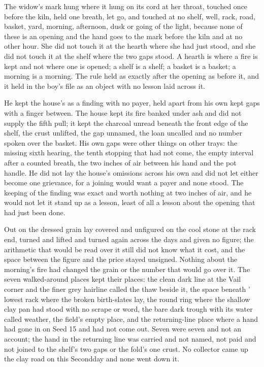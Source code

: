 The widow's mark hung where it hung on its cord at her throat, touched once before the kiln, held one breath, let go, and touched at no shelf, well, rack, road, basket, yard, morning, afternoon, dusk or going of the light, because none of these is an opening and the hand goes to the mark before the kiln and at no other hour. She did not touch it at the hearth where she had just stood, and she did not touch it at the shelf where the two gaps stood. A hearth is where a fire is kept and not where one is opened; a shelf is a shelf; a basket is a basket; a morning is a morning. The rule held as exactly after the opening as before it, and it held in the boy's file as an object with no lesson laid across it.

He kept the house's  as a finding with no payer, held apart from his own kept gaps with a finger between. The house kept its fire banked under ash and did not supply the fifth pull; it kept the charcoal unread beneath the front edge of the shelf, the crust unlifted, the gap unnamed, the loan uncalled and no number spoken over the basket. His own gaps were other things on other trays: the missing sixth hearing, the tenth stopping that had not come, the empty interval after a counted breath, the two inches of air between his hand and the pot handle. He did not lay the house's omissions across his own and did not let either become one grievance, for a joining would want a payer and none stood. The keeping of the finding was exact and worth nothing at two inches of air, and he would not let it stand up as a lesson, least of all a lesson about the opening that had just been done.

Out on  the dressed grain lay covered and unfigured on the cool stone at the rack end, turned and lifted and turned again across the days and given no figure; the arithmetic that would be read over it still did not know what it cost, and the space between the figure and the price stayed unsigned. Nothing about the morning's fire had changed the grain or the number that would go over it. The seven walked-around places kept their places: the clean dark line at the Vail corner and the finer grey hairline called the thaw beside it, the space beneath ' lowest rack where the broken birth-slates lay, the round ring where the shallow clay pan had stood with no scrape or word, the bare dark trough with its water called weather, the field's empty place, and the returning-line place where a hand had gone in on Seed 15 and had not come out. Seven were seven and not an account; the hand in the returning line was carried and not named, not paid and not joined to the shelf's two gaps or the fold's one crust. No collector came up the clay road on this Secondday and none went down it.

